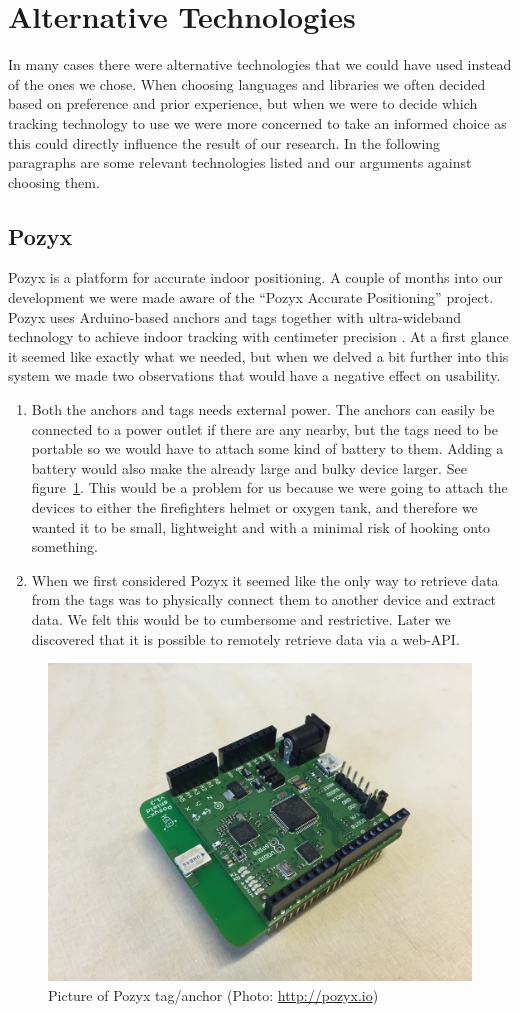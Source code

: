 \documentclass[../Main/thesis.tex]{subfiles}
\begin{document}
\section{Alternative Technologies}
In many cases there were alternative technologies that we could have used instead of the ones we chose.
When choosing languages and libraries we often decided based on preference and prior experience, but when we were to decide which tracking technology to use we were more concerned to take an informed choice as this could directly influence the result of our research.
In the following paragraphs are some relevant technologies listed and our arguments against choosing them.

\subsection{Pozyx}Pozyx is a platform for accurate indoor positioning.
A couple of months into our development we were made aware of the ``Pozyx Accurate Positioning'' project.
Pozyx uses Arduino-based anchors and tags together with ultra-wideband technology to achieve indoor tracking with centimeter precision \citep{Pozyx2017}.
At a first glance it seemed like exactly what we needed, but when we delved a bit further into this system we made two observations that would have a negative effect on usability.
\begin{enumerate}
	\item{Both the anchors and tags needs external power. 
		The anchors can easily be connected to a power outlet if there are any nearby, but the tags need to be portable so we would have to attach some kind of battery to them.
		Adding a battery would also make the already large and bulky device larger.
		See figure~\ref{fig:pozyx_tag}.
		This would be a problem for us because we were going to attach the devices to either the firefighters helmet or oxygen tank, and therefore we wanted it to be small, lightweight and with a minimal risk of hooking onto something.
	}

	\item{When we first considered Pozyx it seemed like the only way to retrieve data from the tags was to physically connect them to another device and extract data.
		We felt this would be to cumbersome and restrictive.
		Later we discovered that it is possible to remotely retrieve data via a web-API.}
\end{enumerate}

\begin{figure}
	\centering
	\includegraphics[width=0.5\linewidth]{../fig/pozyx_tag}
	\caption{Picture of Pozyx tag/anchor (Photo: \url{http://pozyx.io})}
	\label{fig:pozyx_tag}
\end{figure}
\end{document}
